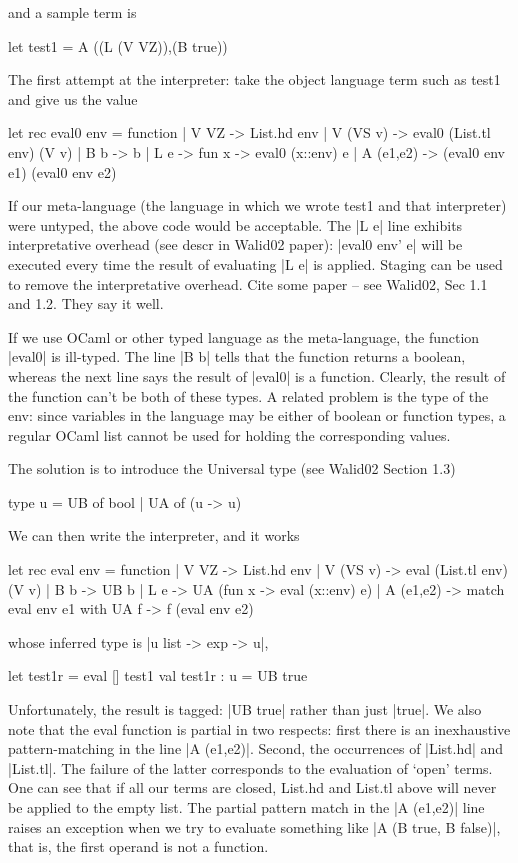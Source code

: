 \documentclass[preprint]{sigplanconf}
\begin{document}
and a sample term is
\begin{code}
  let test1 = A ((L (V VZ)),(B true))
\end{code}

The first attempt at the interpreter: take the object language term
such as test1 and give us the value
\begin{code}
  let rec eval0 env = function 
  | V VZ -> List.hd env
  | V (VS v) -> eval0 (List.tl env) (V v)
  | B b -> b 
  | L e -> fun x -> eval0 (x::env) e
  | A (e1,e2) -> (eval0 env e1) (eval0 env e2) 
\end{code}

If our meta-language (the language in which we wrote test1
and that interpreter) were untyped, the above code would be acceptable.
The |L e| line exhibits interpretative overhead (see descr in Walid02
paper): |eval0 env' e| will be executed every time the result of
evaluating |L e| is applied. Staging can be used to remove the
interpretative overhead. Cite some paper -- see Walid02, Sec 1.1 and
1.2. They say it well.

If we use OCaml or other typed language as the meta-language, 
the function |eval0| is ill-typed. The line |B b|
tells that the function returns a boolean, whereas the next line says
the result of |eval0| is a function. Clearly, the result of the
function can't be both of these types. 
A related problem is the type of the env: since variables
in the language may be either of boolean or function types, a regular
OCaml list cannot be used for holding the corresponding values. 

The solution is to introduce the Universal type (see Walid02 Section
1.3)

\begin{code}
  type u = UB of bool | UA of (u -> u)
\end{code}

We can then write the interpreter, and it works
\begin{code}
  let rec eval env = function
  | V VZ -> List.hd env
  | V (VS v) -> eval (List.tl env) (V v)
  | B b -> UB b
  | L e -> UA (fun x -> eval (x::env) e)
  | A (e1,e2) -> match eval env e1 with UA f -> f (eval env e2)
\end{code}
whose inferred type is |u list -> exp -> u|,

\begin{code}
  let test1r = eval [] test1
  val test1r : u = UB true 
\end{code}

Unfortunately, the result is tagged: |UB true| rather than just
|true|. We also note that the eval function is partial in two
respects: first there is an inexhaustive pattern-matching in the 
line |A (e1,e2)|.
Second, the occurrences of |List.hd| and |List.tl|.
The failure of the latter corresponds to the evaluation of `open'
terms. One can see that if all our terms are closed, List.hd and
List.tl above will never be applied to the empty list. The partial
pattern match in the |A (e1,e2)| line raises an exception when we try to
evaluate something like |A (B true, B false)|, that is, the first
operand is not a function. 
\end{document}

